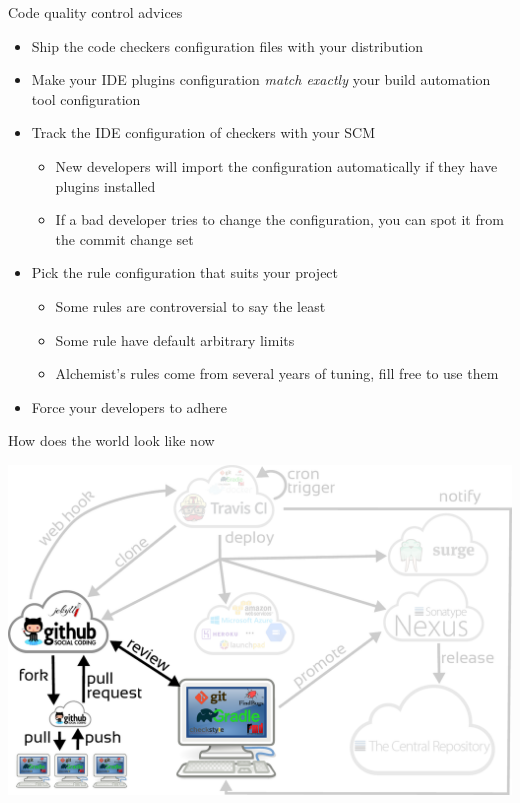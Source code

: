 \documentclass[presentation]{beamer}
\begin{document}
\begin{frame}[fragile]{Code quality control advices}
	\begin{itemize}
		\item Ship the code checkers configuration files with your distribution
		\item Make your IDE plugins configuration \textit{match exactly} your build automation tool configuration
		\item Track the IDE configuration of checkers with your SCM
		\begin{itemize}
			\item New developers will import the configuration automatically if they have plugins installed
			\item If a bad developer tries to change the configuration, you can spot it from the commit change set
		\end{itemize}
		\item Pick the rule configuration that suits your project
		\begin{itemize}
			\item Some rules are controversial to say the least
			\item Some rule have default arbitrary limits
			\item Alchemist's rules come from several years of tuning, fill free to use them
		\end{itemize}
		\item Force your developers to adhere
	\end{itemize}
\end{frame}

\begin{frame}[fragile]{How does the world look like now}
	\begin{center}
		\includegraphics[width=.9\textwidth]{images/ci-codequality}
	\end{center}
\end{frame}
\end{document}
